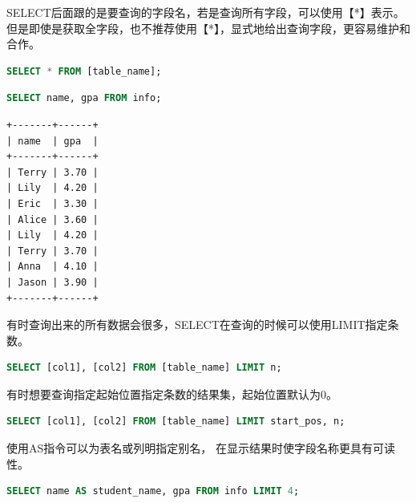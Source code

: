 \documentclass[12pt, openany, oneside]{book}
\begin{document}
SELECT后面跟的是要查询的字段名，若是查询所有字段，可以使用【*】表示。但是即使是获取全字段，也不推荐使用【*】，显式地给出查询字段，更容易维护和合作。

\vspace{-0.5cm}

\begin{lstlisting}[language=SQL]
SELECT * FROM [table_name];
\end{lstlisting}

\vspace{0.5cm}


\begin{lstlisting}[language=SQL]
SELECT name, gpa FROM info;
\end{lstlisting}

\begin{tcolorbox}
\begin{verbatim}
+-------+------+
| name  | gpa  |
+-------+------+
| Terry | 3.70 |
| Lily  | 4.20 |
| Eric  | 3.30 |
| Alice | 3.60 |
| Lily  | 4.20 |
| Terry | 3.70 |
| Anna  | 4.10 |
| Jason | 3.90 |
+-------+------+
\end{verbatim}
\end{tcolorbox}

有时查询出来的所有数据会很多，SELECT在查询的时候可以使用LIMIT指定条数。

\vspace{-0.5cm}

\begin{lstlisting}[language=SQL]
SELECT [col1], [col2] FROM [table_name] LIMIT n;
\end{lstlisting}

有时想要查询指定起始位置指定条数的结果集，起始位置默认为0。

\vspace{-0.5cm}

\begin{lstlisting}[language=SQL]
SELECT [col1], [col2] FROM [table_name] LIMIT start_pos, n;
\end{lstlisting}

使用AS指令可以为表名或列明指定别名， 在显示结果时使字段名称更具有可读性。\\


\begin{lstlisting}[language=SQL]
SELECT name AS student_name, gpa FROM info LIMIT 4;
\end{lstlisting}
\end{document}
